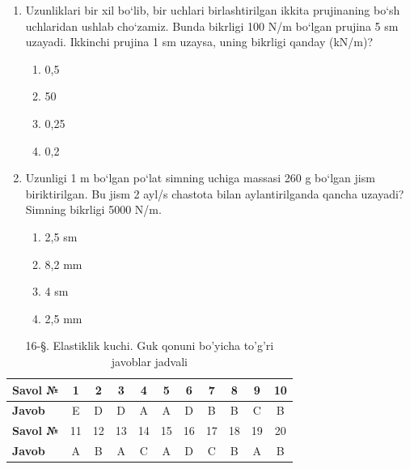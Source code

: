 \begin{enumerate}
\begin{enumerate}[label=\Alph*)]
\item 15
\item 2,4
\item 0,42
\item 1,67
\end{enumerate}

\item Uzunliklari bir xil bo‘lib, bir uchlari birlashtirilgan ikkita prujinaning bo‘sh uchlaridan ushlab cho‘zamiz. Bunda bikrligi 100 N/m bo‘lgan prujina 5 sm uzayadi. Ikkinchi prujina 1 sm uzaysa, uning bikrligi qanday (kN/m)?
\begin{enumerate}[label=\Alph*)]
\item 0,5
\item 50
\item 0,25
\item 0,2
\end{enumerate}

\item Uzunligi 1 m bo‘lgan po‘lat simning uchiga massasi 260 g bo‘lgan jism biriktirilgan. Bu jism 2 ayl/s chastota bilan aylantirilganda qancha uzayadi? Simning bikrligi 5000 N/m.
\begin{enumerate}[label=\Alph*)]
\item 2,5 sm
\item 8,2 mm
\item 4 sm
\item 2,5 mm
\end{enumerate}

\end{enumerate}




\begin{table}[h!]
\centering
\caption{16-§. Elastiklik kuchi. Guk qonuni bo'yicha to'g'ri javoblar jadvali}
\begin{tabular}{|l|c|c|c|c|c|c|c|c|c|c|}
\hline
\textbf{Savol №} & 1 & 2 & 3 & 4 & 5 & 6 & 7 & 8 & 9 & 10 \\ \hline
\textbf{Javob}   & E & D & D & A & A & D & B & B & C & B \\ \hline
\hline
\textbf{Savol №} & 11 & 12 & 13 & 14 & 15 & 16 & 17 & 18 & 19 & 20 \\ \hline
\textbf{Javob}   & A & B & A & C & A & D & C & B & A & B \\ \hline
\end{tabular}
\end{table}